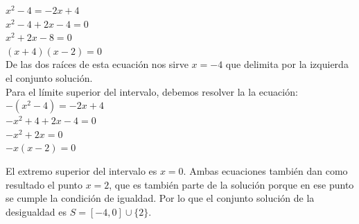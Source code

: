 \documentclass[12pt]{article}
\theoremstyle{definition}
\begin{document}
\begin{enumerate}
\begin{itemize}
\begin{enumerate}
	$x^{2}-4= -2x+4 $\\
	$ x^{2}-4 +2x-4=0 $\\
	$x^{2}+2x-8=0$\\
	$(x+4)(x-2)=0$\\
	De las dos raíces de esta ecuación nos sirve $x=-4$ que delimita por la izquierda el conjunto solución.\\
	Para el límite superior del intervalo, debemos resolver la  la ecuación: \\
	$-(x^{2}-4)= -2x+4 $\\
	$ -x^{2}+4 +2x-4=0 $\\
	$-x^{2}+2x=0$\\
	$-x(x-2)=0$\\
	\end{enumerate}
	El extremo superior del intervalo es $x=0$.
	Ambas ecuaciones también dan como resultado el punto $x=2$, que es también parte de la solución porque en ese punto se 			cumple la condición de igualdad. Por lo que el conjunto solución de la desigualdad es $S = [-4,0] \cup \{2\}$.


\end{itemize}
\end{enumerate}
\end{document}
